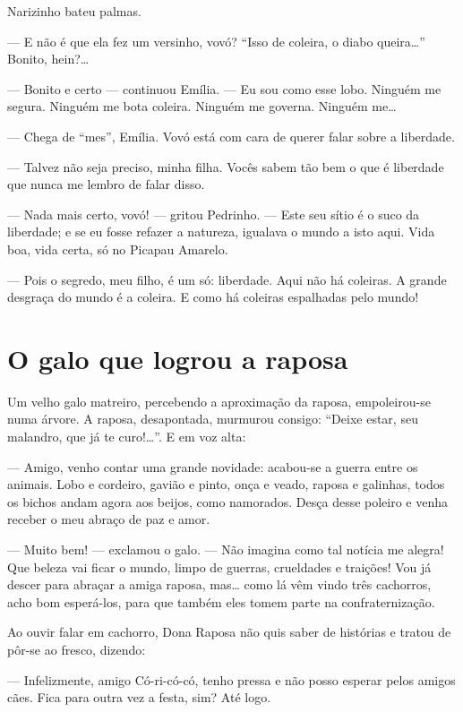 Narizinho bateu palmas.

--- E não é que ela fez um versinho, vovó? ``Isso de coleira, o diabo
queira\ldots{}'' Bonito, hein?\ldots{}

--- Bonito e certo --- continuou Emília. --- Eu sou como esse lobo.
Ninguém me segura. Ninguém me bota coleira. Ninguém me governa. Ninguém
me\ldots{}

--- Chega de ``mes'', Emília. Vovó está com cara de querer falar sobre a
liberdade.

--- Talvez não seja preciso, minha filha. Vocês sabem tão bem o que é
liberdade que nunca me lembro de falar disso.

--- Nada mais certo, vovó! --- gritou Pedrinho. --- Este seu sítio é o
suco da liberdade; e se eu fosse refazer a natureza, igualava o mundo a
isto aqui. Vida boa, vida certa, só no Picapau Amarelo.

--- Pois o segredo, meu filho, é um só: liberdade. Aqui não há coleiras.
A grande desgraça do mundo é a coleira. E como há coleiras espalhadas
pelo mundo!


\chapter{O galo que logrou a raposa}

Um velho galo matreiro, percebendo a aproximação da raposa,
empoleirou-se numa árvore. A raposa, desapontada, murmurou consigo:
``Deixe estar, seu malandro, que já te curo!\ldots{}''. E em voz alta:

--- Amigo, venho contar uma grande novidade: acabou-se a guerra entre os
animais. Lobo e cordeiro, gavião e pinto, onça e veado, raposa e
galinhas, todos os bichos andam agora aos beijos, como namorados. Desça
desse poleiro e venha receber o meu abraço de paz e amor.

--- Muito bem! --- exclamou o galo. --- Não imagina como tal notícia me
alegra! Que beleza vai ficar o mundo, limpo de guerras, crueldades e
traições! Vou já descer para abraçar a amiga raposa, mas\ldots{} como lá
vêm vindo três cachorros, acho bom esperá-los, para que também eles
tomem parte na confraternização.

Ao ouvir falar em cachorro, Dona Raposa não quis saber de histórias e
tratou de pôr-se ao fresco, dizendo:

--- Infelizmente, amigo Có-ri-có-có, tenho pressa e não posso esperar
pelos amigos cães. Fica para outra vez a festa, sim? Até logo.

